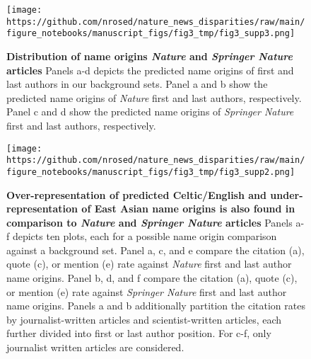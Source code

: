 \begin{fignos:tagged-figure}[Supplemental 5]

\begin{figure}
\hypertarget{fig:supfig_nameorigin_bg}{%
\centering
\texttt{[image: https://github.com/nrosed/nature\_news\_disparities/raw/main/figure\_notebooks/manuscript\_figs/fig3\_tmp/fig3\_supp3.png]}
\caption{\textbf{Distribution of name origins \emph{Nature} and \emph{Springer Nature} articles}
Panels a-d depicts the predicted name origins of first and last authors in our background sets.
Panel a and b show the predicted name origins of \emph{Nature} first and last authors, respectively.
Panel c and d show the predicted name origins of \emph{Springer Nature} first and last authors, respectively.}\label{fig:supfig_nameorigin_bg}
}
\end{figure}

\end{fignos:tagged-figure}

\begin{fignos:tagged-figure}[Supplemental 6]

\begin{figure}
\hypertarget{fig:suppfig4}{%
\centering
\texttt{[image: https://github.com/nrosed/nature\_news\_disparities/raw/main/figure\_notebooks/manuscript\_figs/fig3\_tmp/fig3\_supp2.png]}
\caption{\textbf{Over-representation of predicted Celtic/English and under-representation of East Asian name origins is also found in comparison to \emph{Nature} and \emph{Springer Nature} articles}
Panels a-f depicts ten plots, each for a possible name origin comparison against a background set.
Panel a, c, and e compare the citation (a), quote (c), or mention (e) rate against \emph{Nature} first and last author name origins.
Panel b, d, and f compare the citation (a), quote (c), or mention (e) rate against \emph{Springer Nature} first and last author name origins.
Panels a and b additionally partition the citation rates by journalist-written articles and scientist-written articles, each further divided into first or last author position.
For c-f, only journalist written articles are considered.}\label{fig:suppfig4}
}
\end{figure}

\end{fignos:tagged-figure}

